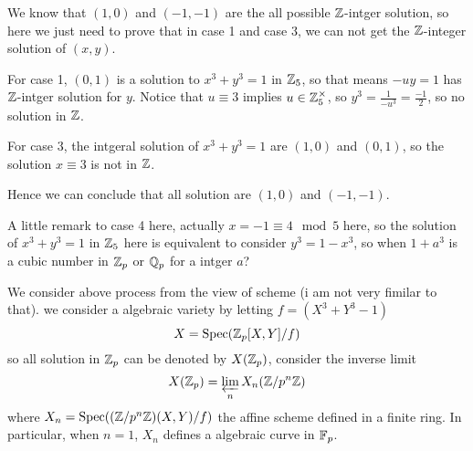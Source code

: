     We know that \((1,0)\) and \((-1,-1)\) are the all possible \(\mathbb{Z}\)-intger solution, so here we just need to prove that in case 1 and case 3, we can not get the \(\mathbb{Z}\)-integer solution of \((x,y)\).

    For case 1, \((0,1)\) is a solution to \(x^3+y^3=1\) in \(\mathbb{Z}_5\), so that means \(-uy=1\) has \(\mathbb{Z}\)-intger solution for \(y\). Notice that \(u \equiv 3\) implies \(u \in \mathbb{Z}_5^{\times}\), so \(y^3=\frac{1}{-u^3} = \frac{-1}{2}\), so no solution in \(\mathbb{Z}\).

    For case 3, the intgeral solution of \(x^3+y^3=1\) are \((1,0)\) and \((0,1)\), so the solution \(x \equiv 3\) is not in \(\mathbb{Z}\).

    Hence we can conclude that all solution are \((1,0)\) and \((-1,-1)\).

    \begin{remark}
        A little remark to case 4 here, actually \(x=-1 \equiv 4 \mod 5\) here, so the solution of \(x^3+y^3=1\) in \(\mathbb{Z}_5\) here is equivalent to consider \(y^3=1-x^3\), so when \(1+a^3\) is a cubic number in \(\mathbb{Z}_p\) or \(\mathbb{Q}_p\) for a intger \(a\)?
    \end{remark}

    We consider above process from the view of scheme (i am not very fimilar to that).
    we consider a algebraic variety by letting \(f = (X^3+Y^3-1)\)
    \[X = \text{Spec}(\mathbb{Z}_p[X,Y]/f)\]
    so all solution in \(\mathbb{Z}_p\) can be denoted by \(X(\mathbb{Z}_p)\), consider the inverse limit
    \[X(\mathbb{Z}_p) = \varprojlim_{n} X_n(\mathbb{Z}/p^n\mathbb{Z})\]
    where \(X_n = \text{Spec}((\mathbb{Z}/p^n\mathbb{Z})(X,Y)/f)\) the affine scheme defined in a finite ring. In particular, when \(n=1\), \(X_n\) defines a algebraic curve in \(\mathbb{F}_p\).